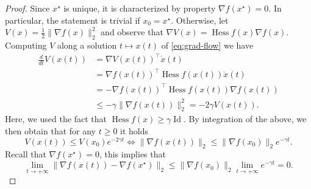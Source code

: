  
     \begin{proof}
         Since $x^\star$ is unique, it is characterized by property $\nabla f(x^\star)=0$. In particular, the statement is trivial if $x_0=x^\star$.
         Otherwise, let $V(x) = \frac12\|\nabla f(x)\|_2^2$ and observe that $\nabla V(x) = \operatorname{Hess}f(x) \nabla f(x)$. Computing $V$ along a solution $t\mapsto x(t)$ of \eqref{eq:grad-flow} we have
         \begin{equation}
             \begin{split}
                 \frac{d}{dt}V(x(t))
                  & = \nabla V(x(t))^\top \dot x(t)                                  \\
                  & = \nabla f(x(t))^\top \operatorname{Hess}f(x(t)) \dot x(t)       \\
                  & = -\nabla f(x(t))^\top \operatorname{Hess}f(x(t)) \nabla f(x(t)) \\
                  & \le -{\gamma} \|\nabla f(x(t))\|_2^2 = -2\gamma V(x(t)).
             \end{split}
         \end{equation}
         Here, we used the fact that $\operatorname{Hess}f(x)\ge \gamma\operatorname{Id}$.
         By integration of the above, we then obtain that for any $t\ge 0$ it holds
         \begin{equation}
             V(x(t)) \le V(x_0)e^{-2\gamma t}
             \iff
             \|\nabla f(x(t))\|_2\le \|\nabla f(x_0)\|_2 e^{-\gamma t}.
         \end{equation}
         Recall that $\nabla f(x^\star)=0$, this implies that
         \begin{equation}
             \label{eq:estimate-grad}
             \lim_{t\to +\infty} \|\nabla f(x(t)) - \nabla f(x^\star)\|_2 \le \|\nabla f(x_0)\|_2 \lim_{t\to +\infty} e^{-\gamma t} = 0.
         \end{equation}
 

\end{proof}
